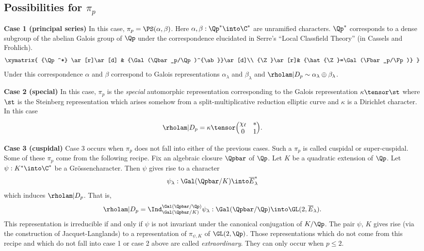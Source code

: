 \documentclass{report}
\begin{document}
\subsection{Possibilities for $\pi_p$}

{\bfseries Case 1 (principal series)}
In this case, $\pi_p=\PS(\alpha,\beta)$.
Here $\alpha,\beta:\Qp^*\into\C^*$ are unramified characters.
$\Qp^*$ corresponds to a dense subgroup of the abelian Galois group
of $\Qp$ under the correspondence elucidated in Serre's
``Local Classfield Theory'' (in Cassels and Frohlich).
$$\xymatrix{
{\Qp^*} \ar[r]\ar[d] & {\Gal(\Qbar_p/\Qp)^{\ab}}\ar[d]\\
 {\Z}\ar[r]& {\hat{\Z}=\Gal(\Fbar_p/\Fp)}
}$$
Under this correspondence $\alpha$ and $\beta$ correspond
to Galois representations $\alpha_{\lambda}$ and $\beta_{\lambda}$
and $\rholam|D_p\sim\alpha_{\lambda}\oplus\beta_{\lambda}$.

{\bfseries Case 2 (special)} In this case, $\pi_p$ is the {\em special}
automorphic representation corresponding to the Galois representation
$\kappa\tensor\st$ where $\st$ is the Steinberg representation which
arises somehow from a split-multiplicative reduction elliptic curve
and $\kappa$ is a Dirichlet character.
In this case
$$\rholam|D_p= \kappa\tensor\Bigl(\begin{matrix}\chi_{\ell}&*\\0&1\end{matrix}\Bigr).$$

{\bfseries Case 3 (cuspidal)} Case 3 occurs when $\pi_p$ does not fall
into either of the previous cases. Such a $\pi_p$ is called cuspidal or
super-cuspidal. Some of these $\pi_p$ come from the following recipe.
Fix an algebraic closure $\Qpbar$ of $\Qp$. Let $K$ be a
quadratic extension of $\Qp$. Let $\psi:K^*\into\C^*$ be a Gr\"ossencharacter.
Then $\psi$ gives rise to a character
$$\psi_{\lambda}:\Gal(\Qpbar/K)\into\overline{E}_{\lambda}^*$$
which induces $\rholam|D_p$. That is,
$$\rholam|D_p=\Ind_{\Gal(\Qpbar/K)}^{\Gal(\Qpbar/\Qp)}\psi_{\lambda}:
\Gal(\Qpbar/\Qp)\into\GL(2,\overline{E}_{\lambda}).$$
This representation is irreducible if and only if $\psi$ is not invariant under
the canonical conjugation of $K/\Qp$. The pair $\psi$, $K$ gives
rise (via the construction of Jacquet-Langlands) to a representation
of $\pi_{\psi,K}$ of $\GL(2,\Qp)$. Those representations which do not come from
this recipe and which do not fall into case 1 or case 2 above are
called {\em extraordinary}. They can only occur when $p\leq 2$.
\end{document}
